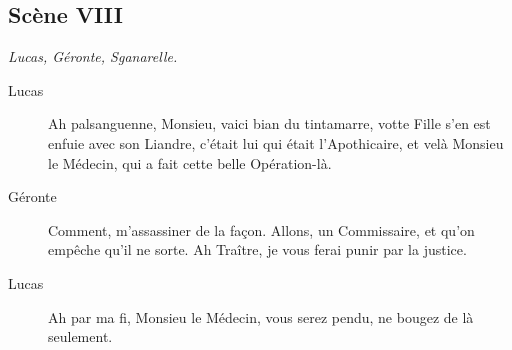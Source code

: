 \documentclass[french,twoside]{book} %
\begin{document}
\subsection[{Scène VIII}]{Scène VIII}
\label{III08}
\textit{Lucas, Géronte, Sganarelle.}\par
 \begin{description} \item[Lucas] 

Ah palsanguenne, Monsieu, vaici bian du tintamarre, votte Fille s’en est enfuie avec son Liandre, c’était lui qui était l’Apothicaire, et velà Monsieu le Médecin, qui a fait cette belle Opération-là.\end{description}
 \begin{description} \item[Géronte] 

Comment, m’assassiner de la façon. Allons, un Commissaire, et qu’on empêche qu’il ne sorte. Ah Traître, je vous ferai punir par la justice.\end{description}
 \begin{description} \item[Lucas] 

Ah par ma fi, Monsieu le Médecin, vous serez pendu, ne bougez de là seulement.\end{description}
\end{document}
